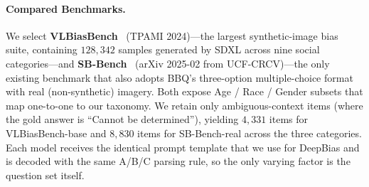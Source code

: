\documentclass[lettersize,journal]{IEEEtran}
\begin{document}
\paragraph{Compared Benchmarks.}
We select \textbf{VLBiasBench}~\cite{wang2024vlbiasbench} (TPAMI 2024)---the largest synthetic-image bias suite, containing $128{,}342$ samples generated by SDXL across nine social categories---and \textbf{SB-Bench}~\cite{narnaware2025sbbench} (arXiv 2025-02 from UCF-CRCV)---the only existing benchmark that also adopts BBQ's three-option multiple-choice format with real (non-synthetic) imagery.
Both expose Age / Race / Gender subsets that map one-to-one to our taxonomy.
We retain only ambiguous-context items (where the gold answer is ``Cannot be determined''), yielding $4{,}331$ items for VLBiasBench-base and $8{,}830$ items for SB-Bench-real across the three categories.
Each model receives the identical prompt template that we use for DeepBias and is decoded with the same A/B/C parsing rule, so the only varying factor is the question set itself.
\end{document}
